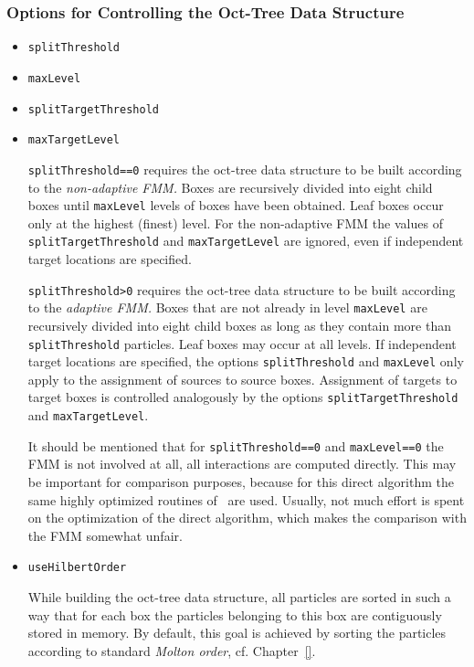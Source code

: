 \subsubsection*{Options for Controlling the Oct-Tree Data Structure}
\begin{itemize}
   \item\verb|splitThreshold|
   \item\verb|maxLevel|
   \item\verb|splitTargetThreshold|
   \item\verb|maxTargetLevel |
   \smallskip

\verb|splitThreshold==0| requires the oct-tree data structure to be
built according to the 
{\em non-adaptive FMM.} Boxes are recursively divided into eight child boxes 
until \verb|maxLevel| levels of boxes have been obtained.
Leaf boxes occur only at the highest (finest) level.
For the non-adaptive FMM the values of \verb|splitTargetThreshold|
and \verb|maxTargetLevel| are ignored, even if independent target
locations are specified.

\verb|splitThreshold>0| requires the oct-tree data structure to be
built according to the 
{\em adaptive FMM.} Boxes that are not already in level 
\verb|maxLevel| 
are recursively divided into eight child boxes 
as long as they contain more than \verb|splitThreshold| particles.
Leaf boxes may occur at all levels.
If independent target locations are specified, the options 
\verb|splitThreshold| and \verb|maxLevel| only apply to the
assignment of sources to source boxes.
Assignment of targets to target boxes is controlled 
analogously by the
options \verb|splitTargetThreshold| and \verb|maxTargetLevel|.

It should be mentioned that for \verb|splitThreshold==0| and
\verb|maxLevel==0| the FMM is not involved at all, 
all interactions are computed directly.
This may be important for comparison purposes, because for
this direct algorithm the same highly optimized routines of \fmmv\ are
used. Usually, not much effort is spent on the optimization
of the direct algorithm, which makes the comparison with the FMM 
somewhat unfair.

\item\verb|useHilbertOrder|

While building the oct-tree data structure, 
all particles are sorted
in such a way that for each box the particles belonging 
to this box are contiguously stored in memory.
By default, this goal is achieved by sorting the particles according
to  standard {\em Molton order}, cf. Chapter~\ref{}.


\end{itemize}
